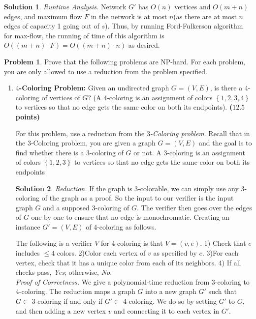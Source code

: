 \documentclass{article}
\theoremstyle{definition}
\newtheorem{problem}{Problem}
\newtheorem*{solution*}{Solution}
\newenvironment{solution}{\begin{solution*}}{{} \end{solution*}}
\newcommand{\grade}[1]{\hfill{\textbf{($\mathbf{#1}$ points)}}}
\newcommand{\set}[1]{\ensuremath{\left\{ #1 \right\}}}
\begin{document}
\begin{solution}
		\emph{Runtime Analysis.} Network $G'$ has $O(n)$ vertices and $O(m+n)$ edges, and maximum flow $F$ in the network is at most $n$(as there are at most $n$ edges of capacity 1 going out of $s$).  Thus, by running Ford-Fulkerson algorithm for max-flow, the running of time of this algorithm is $O((m+n) \cdot F) = O((m+n) \cdot n)$ as desired.
		
		\end{solution}
		
\newpage

\begin{problem}\label{NP}
	Prove that the following problems are NP-hard. For each problem, you are only allowed to use a reduction from the problem specified. 
	
	\begin{enumerate}[label=(\alph*)]
	
		\item \textbf{$4$-Coloring Problem:} Given an undirected graph $G=(V,E)$, is there a $4$-coloring of vertices of $G$? (A $4$-coloring is an assignment of colors $\set{1,2,3,4}$ to vertices so that no edge gets the same color on both its endpoints). 
		\grade{12.5}
		
		\medskip
		For this problem, use a reduction from the \emph{$3$-Coloring problem}. Recall that in the $3$-Coloring problem, you are given a graph $G=(V,E)$ and the goal is to find whether there is a $3$-coloring of $G$ or not. A $3$-coloring is an assignment of colors $\set{1,2,3}$ to vertices so that no edge gets the same color on both its endpoints
			
				\medskip
		\begin{solution}
		
		\emph{Reduction.} If the graph is 3-colorable, we can simply use any 3-coloring of the graph as a proof.  So the input to our verifier is the input graph $G$ and a supposed 3-coloring of $G$. The verifier then goes over the edges of $G$ one by one to ensure that no edge is monochromatic. Creating an instance $G'=(V,E)$ of 4-coloring as follows.
		
The following is a verifier $V$ for 4-coloring is that $V = (v,e)$. 1) Check that $e$ includes $\leq 4$ colors. 2)Color each vertex of $v$ as specified by $e$. 3)For each vertex, check that it has a unique color from each of its neighbors. 4) If all checks pass, \emph{Yes}; otherwise, \emph{No}. \\
		
		\emph{Proof of Correctness.} We give a polynomial-time reduction from 3-coloring to 4-coloring. The reduction maps a graph $G$ into a new graph $G'$ such that $G \in$ 3-coloring if and only if $G' \in$ 4-coloring. We do so by setting $G'$ to $G$, and then adding a new vertex $v$ and connecting it to each vertex in $G'$. 
		

\end{solution}
\end{enumerate}
\end{problem}
\end{document}
